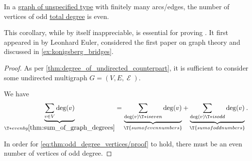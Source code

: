\begin{corollary}\label{thm:odd_degree_vertices}
  In a \hyperref[rem:graph_of_unspecified_type]{graph of unspecified type} with finitely many arcs/edges, the number of vertices of odd \hyperref[def:graph_cardinality/directed_degree]{total degree} is even.
\end{corollary}
\begin{comments}
  \item This corollary, while by itself inappreciable, is essential for proving . It first appeared in \cite{Euler1741Bridges} by Leonhard Euler, considered the first paper on graph theory and discussed in \cref{ex:konigsberg_bridges}.
\end{comments}
\begin{proof}
  As per \cref{thm:degree_of_undirected_counterpart}, it is sufficient to consider some undirected multigraph \( G = (V, E, \mscrE) \).

  We have
  \begin{equation}\label{eq:thm:odd_degree_vertices/proof}
    \underbrace{\sum_{v \in V} \deg(v)}_{\T*{even by} \cref{thm:sum_of_graph_degrees}} = \underbrace{\sum_{\deg(v) \T*{is even}} \deg(v)}_{\T{sum of even numbers}} + \underbrace{\sum_{\deg(v) \T*{is odd}} \deg(v)}_{\T{sum of odd numbers}}.
  \end{equation}

  In order for \eqref{eq:thm:odd_degree_vertices/proof} to hold, there must be an even number of vertices of odd degree.
\end{proof}

